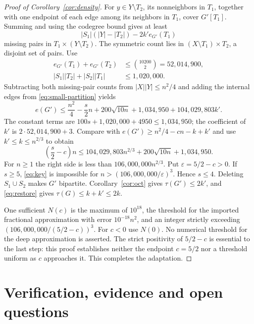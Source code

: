 \documentclass[11pt]{article}
\theoremstyle{definition}\newtheorem{definition}[theorem]{Definition}
\theoremstyle{remark}\newtheorem{remark}[theorem]{Remark}
\begin{document}
\begin{proof}[Proof of Corollary~\ref{cor:density}]
For $y\in Y\setminus T_2$, its nonneighbors in $T_1$, together with
one endpoint of each edge among its neighbors in $T_1$, cover $G'[T_1]$.
Summing and using the codegree bound gives at least
\begin{equation}\label{eq:missing}
|S_1|(|Y|-|T_2|)-2k'e_{G'}(T_1)
\end{equation}
missing pairs in $T_1\times(Y\setminus T_2)$. The symmetric count
lies in $(X\setminus T_1)\times T_2$, a disjoint set of pairs.
Use
\begin{equation}\label{eq:witness-numbers}
\begin{aligned}
e_{G'}(T_1)+e_{G'}(T_2)&\le\binom{10200}{2}=52,014,900,\\
|S_1||T_2|+|S_2||T_1|&\le1,020,000.
\end{aligned}
\end{equation}
Subtracting both missing-pair counts from $|X||Y|\le n^2/4$ and
adding the internal edges from \eqref{eq:small-partition} yields
\begin{equation}\label{eq:upper}
e(G')\le\frac{n^2}{4}-\frac{s}{2}n
 +200\sqrt{10n}+1,034,950+104,029,803k'.
\end{equation}
The constant terms are $100s+1,020,000+4950\le1,034,950$;
the coefficient of $k'$ is $2\cdot52,014,900+3$.
Compare with $e(G')\ge n^2/4-cn-k+k'$ and use
$k'\le k\le n^{2/3}$ to obtain
\begin{equation}\label{eq:key}
\left(\frac{s}{2}-c\right)n
\le104,029,803n^{2/3}+200\sqrt{10n}+1,034,950.
\end{equation}
For $n\ge1$ the right side is less than $106,000,000n^{2/3}$.
Put $\varepsilon=5/2-c>0$. If $s\ge5$, \eqref{eq:key} is impossible
for $n>(106,000,000/\varepsilon)^3$. Hence $s\le4$.
Deleting $S_1\cup S_2$ makes $G'$ bipartite. Corollary~\ref{cor:oct}
gives $\tau(G')\le2k'$, and \eqref{eq:restore} gives
$\tau(G)\le k+k'\le2k$.

One sufficient $N(c)$ is the maximum of $10^{18}$, the threshold for
the imported fractional approximation with error $10^{-18}n^2$, and
an integer strictly exceeding $(106,000,000/(5/2-c))^3$.
For $c<0$ use $N(0)$. No numerical threshold for the deep approximation
is asserted. The strict positivity of $5/2-c$ is essential to the
last step: this proof establishes neither the endpoint $c=5/2$ nor a
threshold uniform as $c$ approaches it. This completes the adaptation.
\end{proof}


\section{Verification, evidence and open questions}\label{sec:verification}
\end{document}
